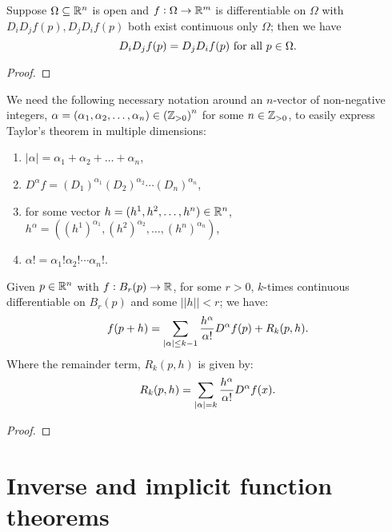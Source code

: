 \documentclass[../Year2.tex]{subfiles}
\begin{document}
\begin{theorem}
    Suppose $\Omega\subseteq\mathbb{R}^n$ is open and $f:\Omega\rightarrow\mathbb{R}^m$ is differentiable on $\Omega$ with $D_i D_j f(p),D_j D_i f(p)$ both exist continuous only $\Omega$; then we have \[
        D_i D_j f(p) = D_j D_i f(p) \ \black{for all } p\in\Omega \black{.}
    \]
    \begin{proof}
        
    \end{proof}
\end{theorem}

\begin{notation}
    We need the following necessary notation around an $n$-vector of non-negative integers, $\alpha=(\alpha_1,\alpha_2,\ldots,\alpha_n)\in{(\mathbb{Z}_{>0})}^n$ for some $n\in\mathbb{Z}_{>0}$, to easily express Taylor's theorem in multiple dimensions: \begin{enumerate}
        \item $|\alpha| = \alpha_1+\alpha_2+\ldots+\alpha_n$,
        \item $D^\alpha f={(D_1)}^{\alpha_1}{(D_2)}^{\alpha_2}\cdots{(D_n)}^{\alpha_n}$,
        \item for some vector $h=(h^1,h^2,\ldots,h^n)\in\mathbb{R}^n$, $h^\alpha = ({(h^1)}^{\alpha_1},{(h^2)}^{\alpha_2},\ldots,{(h^n)}^{\alpha_n})$,
        \item $\alpha! = \alpha_1!\alpha_2!\cdots\alpha_n!$.
    \end{enumerate}
\end{notation}

\begin{theorem}
    Given $p\in\mathbb{R}^n$ with $f:B_r(p)\rightarrow\mathbb{R}$, for some $r>0$, $k$-times continuous differentiable on $B_r(p)$ and some $||h||<r$; we have: \[
        f(p+h)=\sum_{|\alpha|\leq k-1}\frac{h^\alpha}{\alpha!}D^\alpha f(p) + R_k(p,h)\text{\textcolor{black}{.}}
    \] Where the remainder term, $R_k(p,h)$ is given by: \[
        R_k(p,h) = \sum_{|\alpha|=k}\frac{h^\alpha}{\alpha!}D^\alpha f(x)\text{\textcolor{black}{.}}
    \]
    \vspace{-10pt}
    \begin{proof}
        
    \end{proof}
\end{theorem}

\section{Inverse and implicit function theorems}
\end{document}
